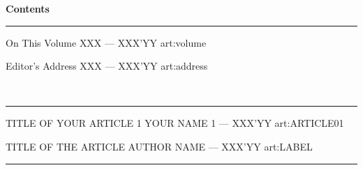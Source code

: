\documentclass[11pt, twoside, a4paper]{article}
\begin{document}



\clearpage
\thispagestyle{frontmatter}
\vspace*{1.5cm}
\begin{center}
  {\LARGE\bfseries\color{cmjcrimson}Contents}
\end{center}
\vspace{0.3cm}
\noindent\textcolor{cmjgold}{\rule{\textwidth}{1.2pt}}
\vspace{0.3cm}

\contentsentry
  {On This Volume}
  {XXX --- XXX'YY}
  {art:volume}

\contentsentry
  {Editor's Address}
  {XXX --- XXX'YY}
  {art:address}

\vspace{0.4cm}
\\[-0.4cm]
\noindent\textcolor{cmjgold}{\rule{\textwidth}{0.8pt}}\vspace{0.6cm}



\vspace{0.6cm}

\contentsentry
  {TITLE OF YOUR ARTICLE 1}
  {YOUR NAME 1 --- XXX'YY}
  {art:ARTICLE01}

\contentsentry
  {TITLE OF THE ARTICLE}
  {AUTHOR NAME --- XXX'YY}
  {art:LABEL}


\vfill
\noindent\textcolor{cmjgold}{\rule{\textwidth}{1.2pt}}

\clearpage
{}








\end{document}
